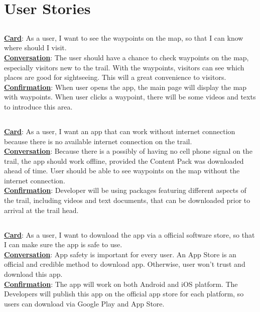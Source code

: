 \documentclass[letterpaper, 10pt,titlepage]{article}
\begin{document}
\section{User Stories}
\subsection{ }
\textbf{\underline{Card}}: As a user, I want to see the waypoints on the map, so that I can know where should I visit.\\ 
\textbf{\underline{Conversation}}: The user should have a chance to check waypoints on the map, especially visitors new to the trail. With the waypoints, visitors can see which places are good for sightseeing. This will a great convenience to visitors.\\
\textbf{\underline{Confirmation}}: When user opens the app, the main page will display the map with waypoints. When user clicks a waypoint, there will be some videos and texts to introduce this area.

\subsection{ }
\textbf{\underline{Card}}: As a user, I want an app that can work without internet connection because there is no available internet connection on the trail.\\
\textbf{\underline{Conversation}}: Because there is a possibly of having no cell phone signal on the trail, the app should work offline, provided the Content Pack was downloaded ahead of time. User should be able to see waypoints on the map without the internet connection.\\
\textbf{\underline{Confirmation}}: Developer will be using packages featuring different aspects of the trail, including videos and text documents, that can be downloaded prior to arrival at the trail head.
\subsection{ }
\textbf{\underline{Card}}: As a user, I want to download the app via a official software store, so that I can make sure the app is safe to use.\\
\textbf{\underline{Conversation}}: App safety is important for every user. An App Store is an official and credible method to download app. Otherwise, user won’t trust and download this app.\\
\textbf{\underline{Confirmation}}: The app will work on both Android and iOS platform. The Developers will publish this app on the official app store for each platform, so users can download via Google Play and App Store.
\end{document}
